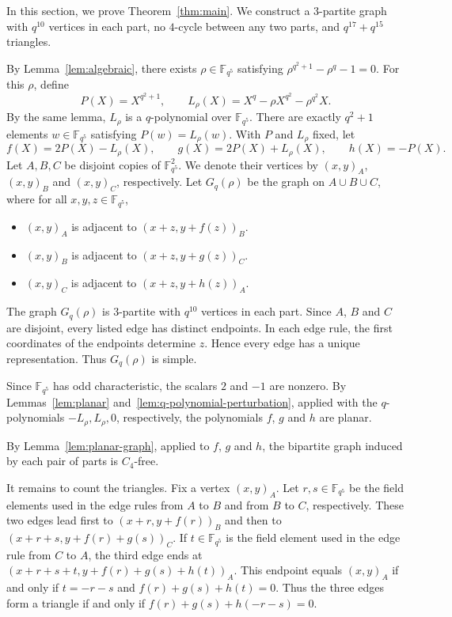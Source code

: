 \documentclass[12pt]{article}
\numberwithin{equation}{section}
\theoremstyle{definition}
\newcommand{\F}{\mathbb F}
\begin{document}
In this section, we prove Theorem~\ref{thm:main}. We construct a $3$-partite graph with $q^{10}$ vertices in each part, no $4$-cycle between any two parts, and $q^{17}+q^{15}$ triangles.

By Lemma~\ref{lem:algebraic}, there exists $\rho\in\F_{q^5}$ satisfying $\rho^{q^2+1}-\rho^q-1=0$. For this $\rho$, define
\[
        P(X)=X^{q^2+1},
        \qquad
        L_\rho(X)=X^q-\rho X^{q^2}-\rho^{q^2}X.
\]
By the same lemma, $L_\rho$ is a $q$-polynomial over $\F_{q^5}$. There are exactly $q^2+1$ elements $w\in\F_{q^5}$ satisfying $P(w)=L_\rho(w)$. With $P$ and $L_\rho$ fixed, let
\[
 f(X)=2P(X)-L_\rho(X),\qquad
 g(X)=2P(X)+L_\rho(X),\qquad
 h(X)=-P(X).
\]
Let $A,B,C$ be disjoint copies of $\F_{q^5}^2$. We denote their vertices by $(x,y)_A$, $(x,y)_B$ and $(x,y)_C$, respectively. Let $G_q(\rho)$ be the graph on $A\cup B\cup C$, where for all $x,y,z\in\F_{q^5}$,
\begin{itemize}
\item $(x,y)_A$ is adjacent to $(x+z,y+f(z))_B$.
\item $(x,y)_B$ is adjacent to $(x+z,y+g(z))_C$.
\item $(x,y)_C$ is adjacent to $(x+z,y+h(z))_A$.
\end{itemize}

The graph $G_q(\rho)$ is $3$-partite with $q^{10}$ vertices in each part. Since $A$, $B$ and $C$ are disjoint, every listed edge has distinct endpoints. In each edge rule, the first coordinates of the endpoints determine $z$. Hence every edge has a unique representation. Thus $G_q(\rho)$ is simple.

Since $\F_{q^5}$ has odd characteristic, the scalars $2$ and $-1$ are nonzero. By Lemmas~\ref{lem:planar} and~\ref{lem:q-polynomial-perturbation}, applied with the $q$-polynomials $-L_\rho,L_\rho,0$, respectively, the polynomials $f$, $g$ and $h$ are planar.

By Lemma~\ref{lem:planar-graph}, applied to $f$, $g$ and $h$, the bipartite graph induced by each pair of parts is $C_4$-free.

It remains to count the triangles. Fix a vertex $(x,y)_A$. Let $r,s\in\F_{q^5}$ be the field elements used in the edge rules from $A$ to $B$ and from $B$ to $C$, respectively. These two edges lead first to $(x+r,y+f(r))_B$ and then to $(x+r+s,y+f(r)+g(s))_C$. If $t\in\F_{q^5}$ is the field element used in the edge rule from $C$ to $A$, the third edge ends at $(x+r+s+t,y+f(r)+g(s)+h(t))_A$. This endpoint equals $(x,y)_A$ if and only if $t=-r-s$ and $f(r)+g(s)+h(t)=0$. Thus the three edges form a triangle if and only if $f(r)+g(s)+h(-r-s)=0$.
\end{document}

